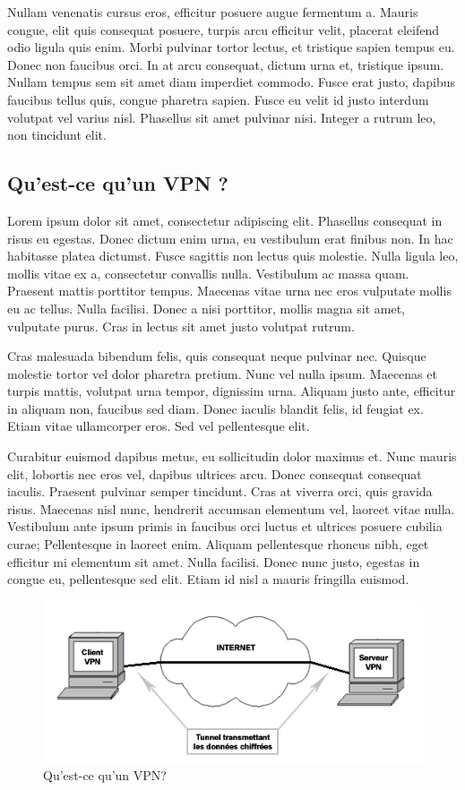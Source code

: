 \documentclass{report}
\begin{document}
Nullam venenatis cursus eros, efficitur posuere augue fermentum a. Mauris congue, elit quis consequat posuere, turpis arcu efficitur velit, placerat eleifend odio ligula quis enim. Morbi pulvinar tortor lectus, et tristique sapien tempus eu. Donec non faucibus orci. In at arcu consequat, dictum urna et, tristique ipsum. Nullam tempus sem sit amet diam imperdiet commodo. Fusce erat justo, dapibus faucibus tellus quis, congue pharetra sapien. Fusce eu velit id justo interdum volutpat vel varius nisl. Phasellus sit amet pulvinar nisi. Integer a rutrum leo, non tincidunt elit.

\subsection{Qu'est-ce qu'un VPN ?}

Lorem ipsum dolor sit amet, consectetur adipiscing elit. Phasellus consequat in risus eu egestas. Donec dictum enim urna, eu vestibulum erat finibus non. In hac habitasse platea dictumst. Fusce sagittis non lectus quis molestie. Nulla ligula leo, mollis vitae ex a, consectetur convallis nulla. Vestibulum ac massa quam. Praesent mattis porttitor tempus. Maecenas vitae urna nec eros vulputate mollis eu ac tellus. Nulla facilisi. Donec a nisi porttitor, mollis magna sit amet, vulputate purus. Cras in lectus sit amet justo volutpat rutrum.

Cras malesuada bibendum felis, quis consequat neque pulvinar nec. Quisque molestie tortor vel dolor pharetra pretium. Nunc vel nulla ipsum. Maecenas et turpis mattis, volutpat urna tempor, dignissim urna. Aliquam justo ante, efficitur in aliquam non, faucibus sed diam. Donec iaculis blandit felis, id feugiat ex. Etiam vitae ullamcorper eros. Sed vel pellentesque elit.

Curabitur euismod dapibus metus, eu sollicitudin dolor maximus et. Nunc mauris elit, lobortis nec eros vel, dapibus ultrices arcu. Donec consequat consequat iaculis. Praesent pulvinar semper tincidunt. Cras at viverra orci, quis gravida risus. Maecenas nisl nunc, hendrerit accumsan elementum vel, laoreet vitae nulla. Vestibulum ante ipsum primis in faucibus orci luctus et ultrices posuere cubilia curae; Pellentesque in laoreet enim. Aliquam pellentesque rhoncus nibh, eget efficitur mi elementum sit amet. Nulla facilisi. Donec nunc justo, egestas in congue eu, pellentesque sed elit. Etiam id nisl a mauris fringilla euismod.

\begin{figure}[!h]
\centering
\includegraphics[width=13cm]{./images/images/vpn1}
\caption{Qu'est-ce qu'un VPN?}
\end{figure}
\end{document}
